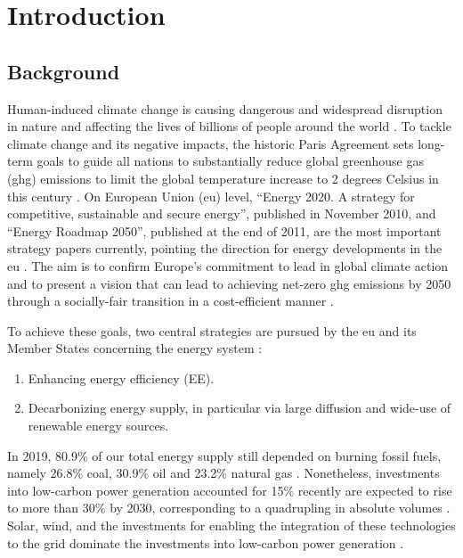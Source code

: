 \chapter{Introduction} 

\section{Background}

Human-induced climate change 
is causing dangerous and widespread disruption in nature 
and affecting the lives 
of billions of people around the world \cite{ipcc}. 
To tackle climate change and its negative impacts, 
the historic Paris Agreement 
sets long-term goals to guide all nations 
to substantially reduce global greenhouse gas (\gls{ghg}) emissions 
to limit the global temperature increase
to 2 degrees Celsius in this century \cite{paris}. 
On European Union (\gls{eu}) level, 
“Energy 2020. A strategy for competitive, sustainable and secure energy”, 
published in November 2010,
and “Energy Roadmap 2050”, 
published at the end of 2011,
are the most important strategy papers currently,  
pointing the direction 
for energy developments in the \gls{eu} \cite{roadmap}. 
The aim is to confirm Europe's commitment 
to lead in global climate action 
and to present a vision 
that can lead to achieving net-zero \gls{ghg} emissions by 2050 
through a socially-fair transition 
in a cost-efficient manner \cite{clean}. 

To achieve these goals, 
two central strategies are pursued 
by the \gls{eu} and its Member States 
concerning the energy system \cite{2050}: 

\begin{enumerate}
  \item Enhancing energy efficiency (EE). 
  \item Decarbonizing energy supply, 
  in particular via large diffusion 
  and wide-use of renewable energy sources.
\end{enumerate}

In 2019, 
80.9\% of our total energy supply still depended on burning fossil fuels, 
namely 
26.8\% coal, 30.9\% oil and 23.2\% natural gas \cite{iea}. 
Nonetheless, investments into low-carbon power generation 
accounted for 15\% recently 
are expected to rise to more than 30\% by 2030, 
corresponding to a quadrupling in absolute volumes \cite{shift}. 
Solar, wind, and the investments 
for enabling the integration of these technologies to the grid 
dominate the investments into low-carbon power generation \cite{shift}. 

